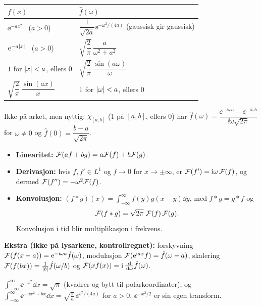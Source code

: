 \begin{formel}[Transformtabellen\fs]
\begin{center}
\begin{tabular}{@{}ll@{}}
\toprule
$f(x)$ & $\hat f(\omega)$\\
\midrule
$\ee^{-ax^2}$ \ ($a>0$) & $\dfrac1{\sqrt{2a}}\ee^{-\omega^2/(4a)}$ \quad (gaussisk gir gaussisk)\\[6pt]
$\mathrm{e}^{-a\lvert x\rvert}$ \ ($a>0$) & $\sqrt{\dfrac2\pi}\,\dfrac{a}{\omega^2+a^2}$\\[6pt]
$1$ for $\lvert x\rvert<a$, ellers $0$ & $\sqrt{\dfrac2\pi}\,\dfrac{\sin(a\omega)}{\omega}$\\[6pt]
$\sqrt{\dfrac2\pi}\,\dfrac{\sin(ax)}x$ & $1$ for $\lvert \omega\rvert<a$, ellers $0$\\
\bottomrule
\end{tabular}
\end{center}
Ikke på arket, men nyttig: $\chi_{[a,b]}$ (1 på $[a,b]$, ellers 0) har $\hat f(\omega)=\dfrac{\ee^{-\ii\omega a}-\ee^{-\ii\omega b}}{\ii\omega\sqrt{2\pi}}$ for $\omega\neq0$ og $\hat f(0)=\dfrac{b-a}{\sqrt{2\pi}}$.
\end{formel}

\begin{teorem}
\begin{itemize}
  \item \textbf{Linearitet:} $\mathcal{F}(af+bg)=a\mathcal{F}(f)+b\mathcal{F}(g)$.
  \item \textbf{Derivasjon:} hvis $f,f'\in L^1$ og $f\to0$ for $x\to\pm\infty$, er $\mathcal{F}(f')=\mathrm{i}\omega\,\mathcal{F}(f)$, og dermed $\mathcal{F}(f'')=-\omega^2\mathcal{F}(f)$.
  \item \textbf{Konvolusjon:} $(f*g)(x)=\displaystyle\int_{-\infty}^{\infty}f(y)g(x-y)\dd y$, med $f*g=g*f$ og
  \[
  \mathcal{F}(f*g)=\sqrt{2\pi}\;\mathcal{F}(f)\,\mathcal{F}(g).
  \]
  Konvolusjon i tid blir multiplikasjon i frekvens.
\end{itemize}
\textbf{Ekstra (ikke på lysarkene, kontrollregnet):} forskyvning $\mathcal{F}(f(x-a))=\mathrm{e}^{-\mathrm{i}\omega a}\hat f(\omega)$, modulasjon $\mathcal{F}(\mathrm{e}^{\mathrm{i} ax}f)=\hat f(\omega-a)$, skalering $\mathcal{F}(f(bx))=\frac1{\lvert b\rvert}\hat f(\omega/b)$ og $\mathcal{F}(xf(x))=\mathrm{i}\,\frac{\,\mathrm{d}}{\,\mathrm{d}\omega}\hat f(\omega)$.
\end{teorem}

\begin{teorem}
$\displaystyle\int_{-\infty}^\infty\ee^{-x^2}\dd x=\sqrt\pi$ (kvadrer og bytt til polarkoordinater), og
$\displaystyle\int_{-\infty}^\infty\ee^{-ax^2+bx}\dd x=\sqrt{\frac\pi a}\,\ee^{b^2/(4a)}$ for $a>0$. $\ee^{-x^2/2}$ er sin egen transform.
\end{teorem}

